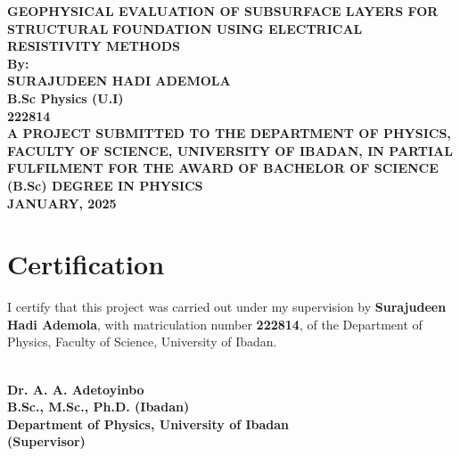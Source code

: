 \documentclass[12pt,a4paper]{report}
\begin{document}
\begin{titlepage}
    \begin{center}
        \large\textbf{GEOPHYSICAL EVALUATION OF SUBSURFACE LAYERS FOR STRUCTURAL}
        \large\textbf{FOUNDATION USING ELECTRICAL RESISTIVITY METHODS} \\[6.0cm]
        
        \textbf{By:} \\[0.2cm]
        
        \Large\textbf{SURAJUDEEN HADI ADEMOLA} \\[0.1cm]
        \Large\textbf{B.Sc Physics (U.I)} \\[0.1cm]
        \Large\textbf{222814} \\[5.3cm]
        
        \large\textbf{A PROJECT SUBMITTED TO THE DEPARTMENT OF PHYSICS, FACULTY OF SCIENCE,
        UNIVERSITY OF IBADAN, IN PARTIAL FULFILMENT FOR THE AWARD OF BACHELOR OF SCIENCE (B.Sc)
        DEGREE IN PHYSICS} \\[4cm]
        
        \textbf{JANUARY, 2025}
    \end{center}
\end{titlepage}


\chapter*{Certification}
\justifying  
I certify that this project was carried out under my supervision by \textbf{Surajudeen Hadi Ademola}, with matriculation number \textbf{222814}, of the Department of Physics, Faculty of Science, University of Ibadan.

\vspace{5cm}  

\begin{center}
    \noindent\makebox[7cm]{\hrulefill}  \\  
    \textbf{Dr. A. A. Adetoyinbo}  \\  
    \textbf{B.Sc., M.Sc., Ph.D. (Ibadan)}  \\  
    \textbf{Department of Physics, University of Ibadan}  \\  
    \textbf{(Supervisor)}  
\end{center}

\vspace{3cm}
\end{document}
